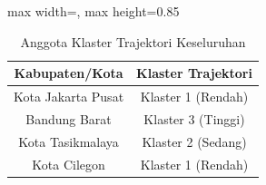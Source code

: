 \begin{table}[H]
\centering
\caption{Anggota Klaster Trajektori Keseluruhan} \label{tab:sampleclustermembers}
\begin{adjustbox}{max width=\textwidth, max height=0.85\textheight}
\begin{tabular}{|c|c|}
\hline
\textbf{Kabupaten/Kota} & \textbf{Klaster Trajektori} \\
\hline
Kota Jakarta Pusat & Klaster 1 (Rendah) \\
Bandung Barat & Klaster 3 (Tinggi) \\
Kota Tasikmalaya & Klaster 2 (Sedang) \\
Kota Cilegon & Klaster 1 (Rendah) \\
\hline
\end{tabular}
\end{adjustbox}
\end{table}